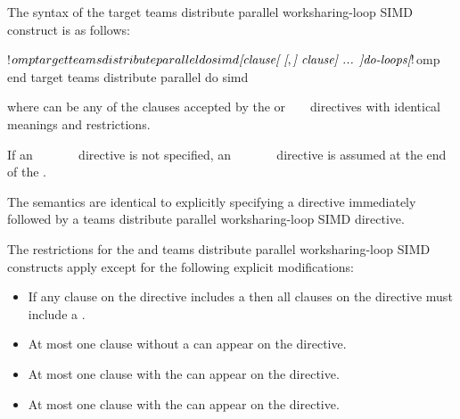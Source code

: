 \begin{fortranspecific}
The syntax of the target teams distribute parallel worksharing-loop SIMD construct is as follows:

\begin{ompfPragma}
!$omp target teams distribute parallel do simd \plc{[clause[ [},\plc{] clause] ... ]}
    \plc{do-loops}
\plc{[}!$omp end target teams distribute parallel do simd\plc{]}
\end{ompfPragma}

where  can be any of the clauses accepted by the
 or ~  ~
directives with identical meanings and restrictions.

If an ~~~~~~
directive is not specified, an
~~~~~~
directive is assumed at the end of the .
\end{fortranspecific}

\descr
The semantics are identical to explicitly specifying a 
directive immediately followed by a teams distribute parallel worksharing-loop
SIMD directive. 


\restrictions
The restrictions for the  and teams distribute parallel
worksharing-loop SIMD constructs apply except for the following explicit modifications:

\begin{itemize}
\item If any  clause on the directive includes a
       then all  clauses
      on the directive must include a .

\item At most one  clause without a
       can appear on the directive.

\item At most one  clause with the 
       can appear on the directive.

\item At most one  clause with the 
       can appear on the directive.
  \end{itemize}

